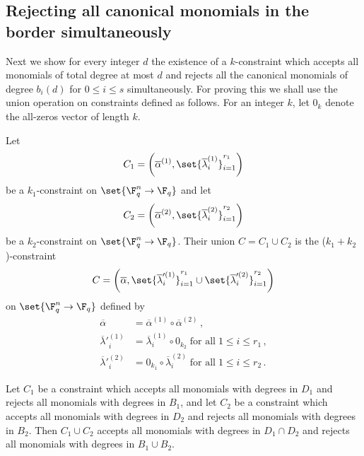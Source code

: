 \subsection{Rejecting all canonical monomials in the border simultaneously}
\label{ssec:simult}

Next we show for every integer $d$ the existence of a $k$-constraint which accepts all monomials of total degree at most $d$
and rejects all the canonical monomials of degree $b_i(d)$ for $0 \leq i \leq s$
simultaneously.
For proving this we shall use the union operation on constraints
defined as follows. For an integer $k$, let $0_k$ denote the all-zeros vector of length $k$.

\begin{definition}\label{def:union}
Let $$C_1=\bigg(\overline \alpha^{(1)}, \set{\overline \lambda^{(1)}_i}_{i=1}^{r_1}\bigg)$$ be a $k_1$-constraint on $\set{\F_q^n \to \F_q}$ and let
$$C_2=\bigg(\overline \alpha^{(2)}, \set{\overline \lambda^{(2)}_i}_{i=1}^{r_2}\bigg)$$ be a $k_2$-constraint on $\set{\F_q^n \to \F_q}$.
Their union $C = C_1 \cup C_2$ is the ($k_1+k_2$)-constraint  $$C=\bigg(\overline \alpha, \set{\overline \lambda'^{(1)}_i}_{i=1}^{r_1} \cup \set{\overline \lambda'^{(2)}_i}_{i=1}^{r_2}\bigg)$$  on $\set{\F_q^n \to \F_q}$ defined by
\begin{align*}
\overline \alpha &= \overline \alpha^{(1)} \circ \overline \alpha^{(2)}\,,\\
\overline \lambda'^{(1)}_i &= \overline \lambda^{(1)}_i \circ 0_{k_2} \; \text{for all} \; 1 \leq i \leq r_1\,,\\
\overline \lambda'^{(2)}_i &=  0_{k_1} \circ \overline
\lambda^{(2)}_i\; \text{for all} \; 1 \leq i \leq r_2\,.
\end{align*}
\end{definition}
 
\begin{proposition}\label{pro:union}
Let $C_1$ be a constraint which accepts all monomials with degrees in
 $D_1$ and rejects all monomials with degrees in $B_1$, and
let $C_2$ be a constraint which accepts all monomials with degrees in $D_2$ and rejects all monomials with degrees in $B_2$.
Then $C_1 \cup C_2$ accepts all monomials with degrees in $D_1 \cap D_2$ and rejects all monomials with degrees in $B_1 \cup B_2$.
\end{proposition}

